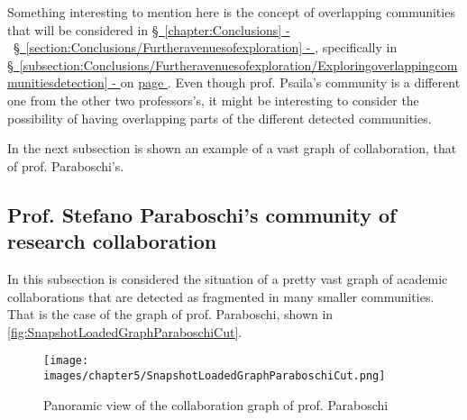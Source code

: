 Something interesting to mention here is the concept of overlapping communities that will be considered in \hyperref[chapter:Conclusions]{\S\ \ref{chapter:Conclusions} - } \  \hyperref[section:Conclusions/Furtheravenuesofexploration]{\S\ \ref{section:Conclusions/Furtheravenuesofexploration} - }, specifically in \hyperref[subsection:Conclusions/Furtheravenuesofexploration/Exploringoverlappingcommunitiesdetection]{\S\ \ref{subsection:Conclusions/Furtheravenuesofexploration/Exploringoverlappingcommunitiesdetection} - } on \hyperref[subsection:Conclusions/Furtheravenuesofexploration/Exploringoverlappingcommunitiesdetection]{page \pageref{subsection:Conclusions/Furtheravenuesofexploration/Exploringoverlappingcommunitiesdetection}}.
Even though prof. Psaila's community is a different one from the other two professors's, it might be interesting to consider the possibility of having overlapping parts of the different detected communities.\label{tobementionedinconclusions/Exploringoverlappingcommunitiesdetection}

In the next subsection is shown an example of a vast graph of collaboration, that of prof. Paraboschi's.

\subsection{Prof. Stefano Paraboschi's community of research collaboration} \label{subsection:Displayoftheresults/Indetailviewofthecollaborationgraph/ProfStefanoParaboschiscommunityofresearchcollaboration}
In this subsection is considered the situation of a pretty vast graph of academic collaborations that are detected as fragmented in many smaller communities.
That is the case of the graph of prof. Paraboschi, shown in \hyperref[fig:SnapshotLoadedGraphParaboschiCut]{\autoref{fig:SnapshotLoadedGraphParaboschiCut}}.

\begin{figure}[H]%
	\centering%
	\texttt{[image: images/chapter5/SnapshotLoadedGraphParaboschiCut.png]}%
	\caption[Panoramic view of the collaboration graph of prof. Paraboschi]{Panoramic view of the collaboration graph of prof. Paraboschi}%
	\label{fig:SnapshotLoadedGraphParaboschiCut}%
\end{figure}%

